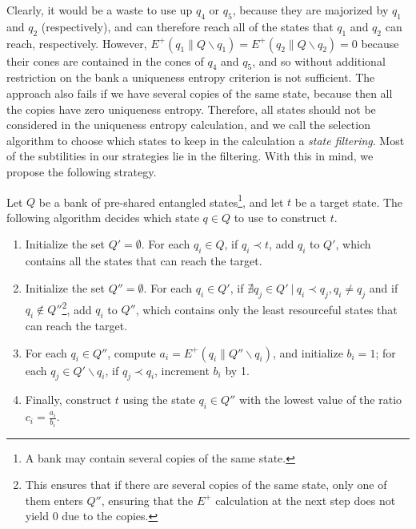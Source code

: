 Clearly, it would be a waste to use up $q_4$ or $q_5$, because they are majorized by $q_1$ and $q_2$ (respectively), and can therefore reach all of the states that $q_1$ and $q_2$ can reach, respectively. However, $E^+(q_1 \parallel Q \backslash q_1) = E^+(q_2 \parallel Q \backslash q_2) = 0$ because their cones are contained in the cones of $q_4$ and $q_5$, and so without additional restriction on the bank a uniqueness entropy criterion is not sufficient. The approach also fails if we have several copies of the same state, because then all the copies have zero uniqueness entropy. Therefore, all states should not be considered in the uniqueness entropy calculation, and we call the selection algorithm to choose which states to keep in the calculation a \textit{state filtering}. Most of the subtilities in our strategies lie in the filtering. With this in mind, we propose the following strategy.

\begin{definition} \label{strat:uniqueness}
    Let $Q$ be a bank of pre-shared entangled states\footnote{A bank may contain several copies of the same state.}, and let $t$ be a target state. The following algorithm decides which state $q \in Q$ to use to construct $t$.
    \begin{enumerate}
        \item Initialize the set $Q' = \emptyset$. For each $q_i \in Q$, if $q_i \prec t$, add $q_i$ to $Q'$, which contains all the states that can reach the target.
        \item Initialize the set $Q'' = \emptyset$. For each $q_i \in Q'$, if $\nexists q_j \in Q' \: | \: q_i \prec q_j, q_i \neq q_j$ and if $q_i \notin Q''$\footnote{This ensures that if there are several copies of the same state, only one of them enters $Q''$, ensuring that the $E^+$ calculation at the next step does not yield 0 due to the copies.}, add $q_i$ to $Q''$, which contains only the least resourceful states that can reach the target.
        \item For each $q_i \in Q''$, compute $a_i = E^+(q_i \parallel Q'' \backslash q_i)$, and initialize $b_i = 1$; for each $q_j \in Q' \backslash q_i$, if $q_j \prec q_i$, increment $b_i$ by 1. \label{step:volume}
        \item Finally, construct $t$ using the state $q_i \in Q''$ with the lowest value of the ratio $c_i = \frac{a_i}{b_i}$.
    \end{enumerate}
\end{definition}


